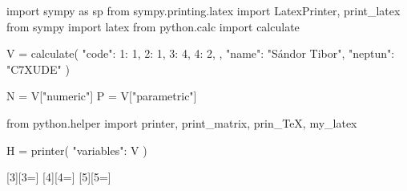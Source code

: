 \usepackage[executable=/opt/homebrew/bin/python3]{pyluatex}

\begin{python}
import sympy as sp
from sympy.printing.latex import LatexPrinter, print_latex
from sympy import latex
from python.calc import calculate

V = calculate({
    "code": {
        1: 1, 
        2: 1,
        3: 4,
        4: 2,
    },
    "name": "Sándor Tibor",
    "neptun": "C7XUDE"
})

N = V["numeric"]
P = V["parametric"]

from python.helper import printer, print_matrix, prin_TeX, my_latex

H = printer({
    "variables": V
})
\end{python}

\usepackage{xargs}

\newcommand{\pv}[1]{\py{V["#1"]}}
\newcommand{\pvec}[2]{\py{V["#1"][#2]}}
\newcommand{\pmat}[3]{\py{V["#1"][#2, #3]}}

[3][3=]{}
[4][4=]{}
[5][5=]{}
